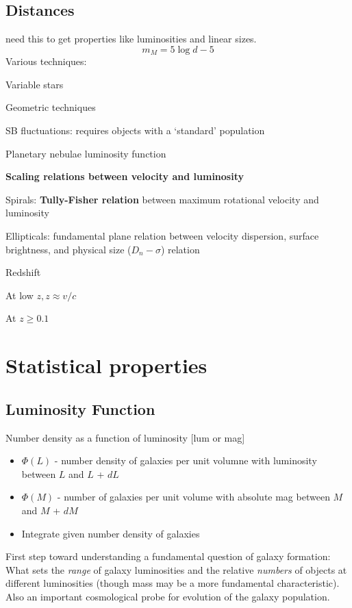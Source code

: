 \documentclass[12pt]{article}
\begin{document}
\subsection*{Distances}
need this to get properties like luminosities and linear sizes.
$$    m_M = 5\log{d}-5 $$
Various techniques:
\begin{itemize*}
    \item Variable stars
    \item Geometric techniques
    \item SB fluctuations: requires objects with a `standard' population
    \item Planetary nebulae luminosity function
    \item \textbf{Scaling relations between velocity and luminosity}
    \begin{itemize*}
      \item Spirals: \textbf{Tully-Fisher relation} between maximum
        rotational velocity and luminosity
      \item Ellipticals: fundamental plane relation between velocity
        dispersion, surface brightness, and physical size ($D_n -
        \sigma$) relation
    \end{itemize*}
    \item Redshift
    \begin{itemize*}
      \item At low $z, z \approx v/c$
      \item At $z \geq 0.1$
    \end{itemize*}
\end{itemize*}

\section*{Statistical properties}
\subsection*{Luminosity Function}
Number density as a function of luminosity [lum or mag]
\begin{itemize}
    \item $\Phi(L)$ - number density of galaxies per unit volumne with
      luminosity between $L$ and $L$ + $dL$
    \item $\Phi(M)$ - number of galaxies per unit volume with absolute
      mag between $M$ and $M$ + $dM$
    \item Integrate given number density of galaxies
\end{itemize}
First step toward understanding a fundamental question of galaxy formation: What
    sets the \emph{range} of galaxy luminosities and the relative
    \emph{numbers} of objects at different luminosities (though mass
    may be a more fundamental characteristic). Also an important
    cosmological probe for evolution of the galaxy population.
\end{document}
